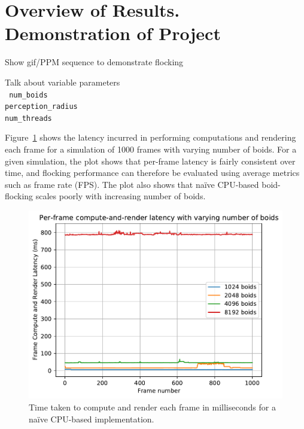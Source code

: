 \section{Overview of Results. Demonstration of Project}
% 
Show gif/PPM sequence to demonstrate flocking 

% 
Talk about variable parameters \\
\texttt{
num\_boids \\
perception\_radius \\
num\_threads \\
}

Figure~\ref{fig:framelatency} shows the latency incurred in performing computations and rendering each frame for a simulation of 1000 frames with varying number of boids. For a given simulation, the plot shows that per-frame latency is fairly consistent over time, and flocking performance can therefore be evaluated using average metrics such as frame rate (FPS). The plot also shows that naïve CPU-based boid-flocking scales poorly with increasing number of boids.

\begin{figure}[ht!]
\centering
\includegraphics[scale=0.8]{plots/latency-per-frame.pdf}
\caption{Time taken to compute and render each frame in milliseconds for a naïve CPU-based implementation.}
\label{fig:framelatency}
\end{figure}
